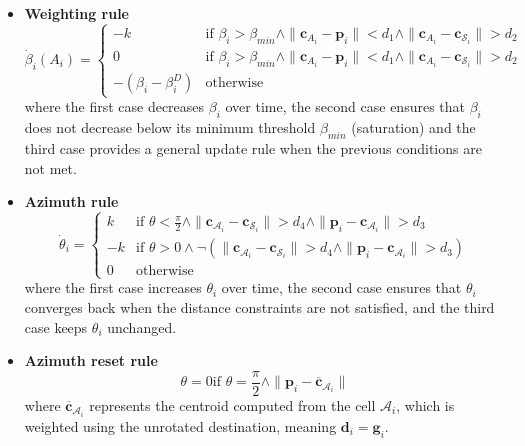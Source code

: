         \begin{itemize}
            \item \textbf{Weighting rule}
                \begin{equation}
                    \dot{\beta}_i(A_i) = 
                    \begin{cases}
                        -k & \text{if } \beta_i > \beta_{min} \land \|\mathbf{c}_{A_i} - \mathbf{p}_i\| < d_1 \land \|\mathbf{c}_{A_i} - \mathbf{c}_{\mathcal{S}_i}\| > d_2  \\
                        0  & \text{if } \beta_i > \beta_{min} \land \|\mathbf{c}_{A_i} - \mathbf{p}_i\| < d_1 \land \|\mathbf{c}_{A_i} - \mathbf{c}_{\mathcal{S}_i}\| > d_2  \\
                        -(\beta_i - \beta_i^D) & \text{otherwise}
                    \end{cases}
                \end{equation}
                where the first case decreases $\beta_i$ over time, the second case ensures that $\beta_i$ does not decrease below its minimum threshold $\beta_{min}$ (saturation) and the third case provides a general update rule when the previous conditions are not met.
            \item \textbf{Azimuth rule}
                \begin{equation}
                    \dot{\theta}_i = 
                    \begin{cases}
                        k  & \text{if } \theta < \frac{\pi}{2} \land \|\mathbf{c}_{\mathcal{A}_i} - \mathbf{c}_{\mathcal{S}_i}\| > d_4 \land \|\mathbf{p}_i - \mathbf{c}_{\mathcal{A}_i}\| > d_3 \\
                        -k & \text{if } \theta > 0 \land \neg (\|\mathbf{c}_{\mathcal{A}_i} - \mathbf{c}_{\mathcal{S}_i}\| > d_4 \land \|\mathbf{p}_i - \mathbf{c}_{\mathcal{A}_i}\| > d_3) \\
                        0  & \text{otherwise}
                    \end{cases}
                \end{equation}
                where the first case increases $\theta_i$ over time, the second case ensures that $\theta_i$ converges back when the distance constraints are not satisfied, and the third case keeps $\theta_i$ unchanged.
            \item \textbf{Azimuth reset rule}
                \begin{equation}
                    \theta = 0 \text{if } \theta = \frac{\pi}{2} \land \| \mathbf{p}_i - \mathbf{\overline{c}}_{\mathcal{A}_i} \|    
                \end{equation}
                where $\mathbf{\overline{c}}_{\mathcal{A}_i}$ represents the centroid computed from the cell $\mathcal{A}_i$, which is weighted using the unrotated destination, meaning $\mathbf{d}_i = \mathbf{g}_i$.
        \end{itemize}
        


